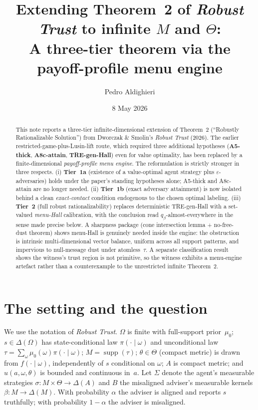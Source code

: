 \documentclass[11pt]{article}
\title{
  Extending Theorem~2 of \emph{Robust Trust} to infinite $M$ and $\Theta$:\\
  \large A three-tier theorem via the payoff-profile menu engine
}
\author{Pedro Aldighieri}
\date{8 May 2026}
\theoremstyle{definition}
\theoremstyle{remark}
\newcommand{\eps}{\varepsilon}
\newcommand{\Om}{\Omega}
\newcommand{\Th}{\Theta}
\newcommand{\Si}{\Sigma}
\newcommand{\suppset}{\operatorname{supp}}
\begin{document}
\maketitle

\begin{abstract}
This note reports a three-tier infinite-dimensional extension of
Theorem~2 (``Robustly Rationalizable Solution'') from Dworczak \&
Smolin's \emph{Robust Trust} (2026). The earlier
restricted-game-plus-Lusin-lift route, which required three
additional hypotheses (\textbf{A5-thick}, \textbf{A8c-attain},
\textbf{TRE-gen-Hall}) even for value optimality, has been replaced
by a finite-dimensional \emph{payoff-profile menu engine}. The
reformulation is strictly stronger in three respects. (i)
\textbf{Tier~1a} (existence of a value-optimal agent strategy plus
$\eps$-adversaries) holds under the paper's standing hypotheses
alone; A5-thick and A8c-attain are no longer needed. (ii)
\textbf{Tier~1b} (exact adversary attainment) is now isolated behind
a clean \emph{exact-contact} condition endogenous to the chosen
optimal labeling. (iii) \textbf{Tier~2} (full robust
rationalizability) replaces deterministic TRE-gen-Hall with a
set-valued \emph{menu-Hall} calibration, with the conclusion read
$q_\beta$-almost-everywhere in the sense made precise below. A
sharpness package (cone intersection lemma + no-free-dust theorem)
shows menu-Hall is genuinely needed inside the engine: the
obstruction is intrinsic multi-dimensional vector balance, uniform
across all support patterns, and impervious to null-message dust
under atomless~$\tau$. A separate classification result shows the
witness's trust region is not primitive, so the witness exhibits a
menu-engine artefact rather than a counterexample to the unrestricted
infinite Theorem~2.
\end{abstract}

\section{The setting and the question}\label{sec:setting}

We use the notation of \emph{Robust Trust}. $\Om$ is finite with
full-support prior~$\mu_0$; $s\in\Delta(\Om)$ has state-conditional
law $\pi(\cdot\mid\omega)$ and unconditional law
$\tau = \sum_\omega \mu_0(\omega)\pi(\cdot\mid\omega)$;
$M = \suppset(\tau)$; $\theta\in\Th$ (compact metric) is drawn from
$f(\cdot\mid\omega)$, independently of $s$ conditional on $\omega$;
$A$ is compact metric; and $u(a,\omega,\theta)$ is bounded and
continuous in~$a$. Let $\Si$ denote the agent's measurable strategies
$\sigma:M\times\Th\to\Delta(A)$ and $B$ the misaligned adviser's
measurable kernels $\beta:M\to\Delta(M)$. With probability $\alpha$
the adviser is aligned and reports $s$ truthfully; with probability
$1-\alpha$ the adviser is misaligned.
\end{document}
